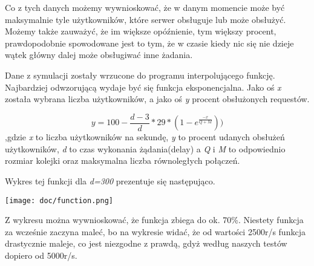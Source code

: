 \documentclass{article}
\begin{document}
    Co z tych danych możemy wywnioskować, że w danym momencie może być maksymalnie tyle użytkowników, które serwer obsługuje lub może obsłużyć.
    Możemy także zauważyć, że im większe opóźnienie, tym większy procent, prawdopodobnie spowodowane jest to tym, że
    w czasie kiedy nic się nie dzieje wątek główny dalej może obsługiwać inne żadania.

    Dane z symulacji zostały wrzucone do programu interpolującego funkcję.
    Najbardziej odwzorującą wydaje być się funkcja eksponencjalna.\newline
    Jako oś \emph{x} została wybrana liczba użytkowników, a jako oś \emph{y} procent obsłużonych requestów.

    \begin{equation*}
        y = 100 - \frac{d-3}{d}*29*(1-e^\frac{-x}{Q+M}))
    \end{equation*},gdzie \emph{x} to liczba użytkowników na sekundę,\newline
                          \emph{y} to procent udanych obsłużeń użytkowników, \newline
                          \emph{d} to czas wykonania żądania(delay) \newline
                          a \emph{Q} i \emph{M} to odpowiednio rozmiar kolejki oraz maksymalna liczba równoległych połączeń.

    Wykres tej funkcji dla \emph{d=300} prezentuje się następująco.

    \begin{figure*}[ht!]
        \centering
        \texttt{[image: doc/function.png]}
        \label{fig:figure}
    \end{figure*}

    Z wykresu można wywnioskować, że funkcja zbiega do ok. 70\%. Niestety funkcja za wcześnie zaczyna maleć, bo na wykresie
    widać, że od wartości 2500r/s funkcja drastycznie maleje, co jest niezgodne z prawdą, gdyż według naszych testów dopiero od 5000r/s.
\end{document}
